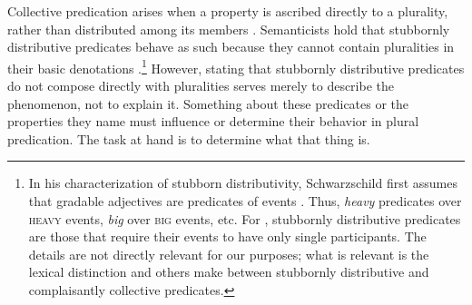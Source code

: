 \documentclass[linguex]{sp}
\newcommand{\ndg}[1]{\textcolor{Green}{[ndg: #1]}}
\begin{document}
Collective predication arises when a property is ascribed directly to a plurality, rather than distributed among its members \citep{link1983}. Semanticists hold that stubbornly distributive predicates behave as such because they cannot contain pluralities in their basic denotations \citep{schwarzschild2011,vazquezrojas2012,zhang2013}.\footnote{In his characterization of stubborn distributivity, Schwarzschild first assumes that gradable adjectives are predicates of events \citep[e.g.,][]{higginbothamschein1989}. Thus, \emph{heavy} predicates over \textsc{heavy} events, \emph{big} over \textsc{big} events, etc. For \citeauthor{schwarzschild2011}, stubbornly distributive predicates are those that require their events to have only single participants. The details are not directly relevant for our purposes; what is relevant is the lexical distinction \citeauthor{schwarzschild2011} and others make between stubbornly distributive and complaisantly collective predicates.}
However, stating that stubbornly distributive predicates do not compose directly with pluralities serves merely to describe the phenomenon, not to explain it.
Something about these predicates or the properties they name must influence or determine their behavior in plural predication. The task at hand is to determine what that thing is. 



\end{document}
